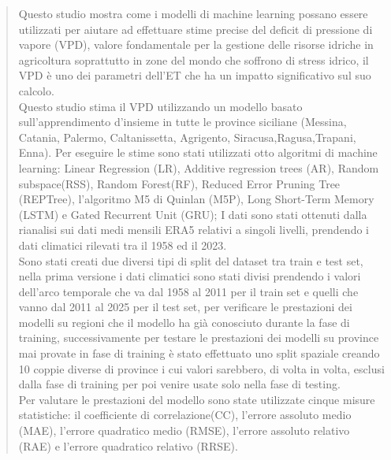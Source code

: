 \begin{abstract}
Questo studio mostra come i modelli di machine learning possano essere utilizzati per aiutare ad effettuare stime precise del deficit di pressione di vapore (VPD), valore fondamentale per la gestione delle risorse idriche in agricoltura soprattutto in zone del mondo che soffrono di stress idrico, il VPD è uno dei parametri dell'ET che ha un impatto significativo sul suo calcolo.\\
Questo studio stima il VPD utilizzando un modello basato sull'apprendimento d'insieme in tutte le province siciliane (Messina, Catania, Palermo, Caltanissetta, Agrigento, Siracusa,Ragusa,Trapani, Enna). Per eseguire le stime sono stati utilizzati otto algoritmi di machine learning: Linear Regression (LR), Additive regression trees (AR), Random subspace(RSS), Random Forest(RF), Reduced Error Pruning Tree (REPTree), l'algoritmo M5 di Quinlan (M5P), Long Short-Term Memory (LSTM) e Gated Recurrent Unit (GRU); I dati sono stati ottenuti dalla rianalisi sui dati medi mensili ERA5 relativi a singoli livelli, prendendo i dati climatici rilevati tra il 1958 ed il 2023.\\
Sono stati creati due diversi tipi di split del dataset tra train e test set, nella prima versione i dati climatici sono stati divisi prendendo i valori dell'arco temporale che va dal 1958 al 2011 per il train set e quelli che vanno dal 2011 al 2025 per il test set, per verificare le prestazioni dei modelli su regioni che il modello ha già conosciuto durante la fase di training, successivamente per testare le prestazioni dei modelli su province mai provate in fase di training è stato effettuato uno split spaziale creando 10 coppie diverse di province i cui valori sarebbero, di volta in volta, esclusi dalla fase di training per poi venire usate solo nella fase di testing.\\
Per valutare le prestazioni del modello sono state utilizzate cinque misure statistiche: il coefficiente di correlazione(CC), l'errore assoluto medio (MAE), l'errore quadratico medio (RMSE), l'errore assoluto relativo (RAE) e l'errore quadratico relativo (RRSE).

\end{abstract}